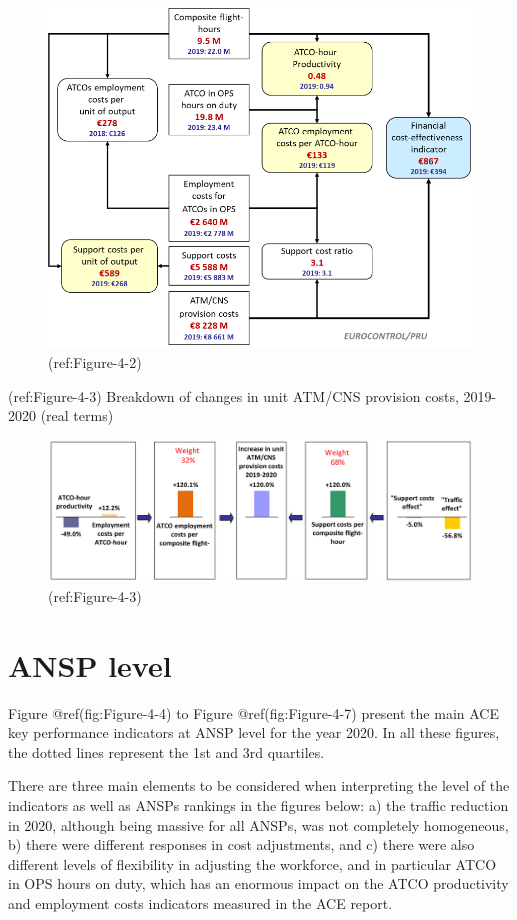 \documentclass[
]{book}
\begin{document}
\begin{figure}

{\centering \includegraphics[width=0.7\linewidth]{figures/Figure-4-2} 

}

\caption{(ref:Figure-4-2)}\label{fig:Figure-4-2}
\end{figure}

(ref:Figure-4-3) Breakdown of changes in unit ATM/CNS provision costs,
2019-2020 (real terms)

\begin{figure}

{\centering \includegraphics[width=0.8\linewidth]{figures/Figure-4-3} 

}

\caption{(ref:Figure-4-3)}\label{fig:Figure-4-3}
\end{figure}

\hypertarget{fin_2}{%
\section{ANSP level}\label{fin_2}}

Figure @ref(fig:Figure-4-4) to Figure @ref(fig:Figure-4-7) present the
main ACE key performance indicators at ANSP level for the year 2020. In
all these figures, the dotted lines represent the 1st and 3rd quartiles.

There are three main elements to be considered when interpreting the
level of the indicators as well as ANSPs rankings in the figures below:
a) the traffic reduction in 2020, although being massive for all ANSPs,
was not completely homogeneous, b) there were different responses in
cost adjustments, and c) there were also different levels of flexibility
in adjusting the workforce, and in particular ATCO in OPS hours on duty,
which has an enormous impact on the ATCO productivity and employment
costs indicators measured in the ACE report.
\end{document}

